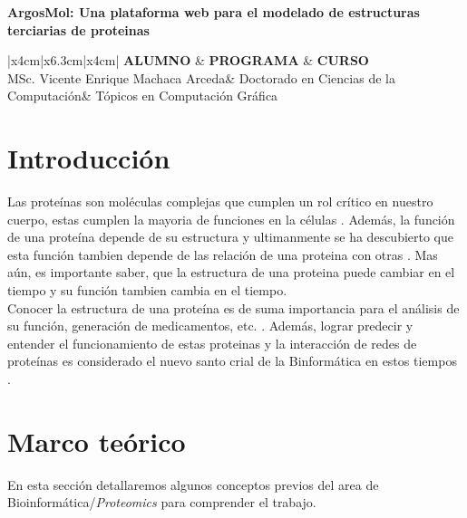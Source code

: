 \documentclass{article}
\newcommand{\csdocente}{MSc. Vicente Enrique Machaca Arceda}
\newcommand{\cscurso}{Tópicos en Computación Gráfica}
\newcommand{\csescuela}{Doctorado en Ciencias de la Computación}
\begin{document}
	
	\vspace*{10px}
	
	\begin{center}	
		\fontsize{17}{17} \textbf{ ArgosMol: Una plataforma web para el modelado de estructuras terciarias de proteinas }
	\end{center}
	

	\begin{table}[h]
		\begin{tabular}{|x{4cm}|x{6.3cm}|x{4cm}|}
			\hline 
			\textbf{ALUMNO} & \textbf{PROGRAMA}  & \textbf{CURSO}   \\
			\hline 
			\csdocente & \csescuela & \cscurso    \\
			\hline 
		\end{tabular}
	\end{table}	
	
		
	
\section{Introducción}
	
	Las proteínas son moléculas complejas que cumplen un rol crítico en nuestro cuerpo, estas cumplen la mayoria de funciones en la células \citep{anderson1998proteome}. Además, la función de una proteína depende de su estructura \citep{rangwala2010introduction} y ultimanmente se ha descubierto que esta función tambien depende de las relación de una proteina con otras \citep{canzarprotein}. Mas aún, es importante saber, que la estructura de una proteina puede cambiar en el tiempo y su función tambien cambia en el tiempo. \\
	
	Conocer la estructura de una proteína es de suma importancia para el análisis de su función, generación de medicamentos, etc. \citep{rangwala2010introduction}. Además, lograr predecir y entender el funcionamiento de estas proteinas y la interacción de redes de proteínas es considerado el nuevo santo crial de la Binformática en estos tiempos \citep{srihari2017computational}. 
	
	
\section{Marco teórico}
	
	En esta sección detallaremos algunos conceptos previos del area de Bioinformática/\textit{Proteomics} para comprender el trabajo.
	
\end{document}
